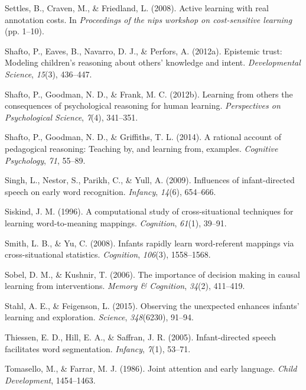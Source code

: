 \documentclass[english,floatsintext,man]{apa6}
\theoremstyle{definition}
\theoremstyle{definition}
\theoremstyle{definition}
\theoremstyle{remark}
\begin{document}
\hypertarget{ref-settles2008active}{}
Settles, B., Craven, M., \& Friedland, L. (2008). Active learning with
real annotation costs. In \emph{Proceedings of the nips workshop on
cost-sensitive learning} (pp. 1--10).

\hypertarget{ref-shafto2012epistemic}{}
Shafto, P., Eaves, B., Navarro, D. J., \& Perfors, A. (2012a). Epistemic
trust: Modeling children's reasoning about others' knowledge and intent.
\emph{Developmental Science}, \emph{15}(3), 436--447.

\hypertarget{ref-shafto2012learning}{}
Shafto, P., Goodman, N. D., \& Frank, M. C. (2012b). Learning from
others the consequences of psychological reasoning for human learning.
\emph{Perspectives on Psychological Science}, \emph{7}(4), 341--351.

\hypertarget{ref-shafto2014rational}{}
Shafto, P., Goodman, N. D., \& Griffiths, T. L. (2014). A rational
account of pedagogical reasoning: Teaching by, and learning from,
examples. \emph{Cognitive Psychology}, \emph{71}, 55--89.

\hypertarget{ref-singh2009influences}{}
Singh, L., Nestor, S., Parikh, C., \& Yull, A. (2009). Influences of
infant-directed speech on early word recognition. \emph{Infancy},
\emph{14}(6), 654--666.

\hypertarget{ref-siskind1996computational}{}
Siskind, J. M. (1996). A computational study of cross-situational
techniques for learning word-to-meaning mappings. \emph{Cognition},
\emph{61}(1), 39--91.

\hypertarget{ref-smith2008infants}{}
Smith, L. B., \& Yu, C. (2008). Infants rapidly learn word-referent
mappings via cross-situational statistics. \emph{Cognition},
\emph{106}(3), 1558--1568.

\hypertarget{ref-sobel2006importance}{}
Sobel, D. M., \& Kushnir, T. (2006). The importance of decision making
in causal learning from interventions. \emph{Memory \& Cognition},
\emph{34}(2), 411--419.

\hypertarget{ref-stahl2015observing}{}
Stahl, A. E., \& Feigenson, L. (2015). Observing the unexpected enhances
infants' learning and exploration. \emph{Science}, \emph{348}(6230),
91--94.

\hypertarget{ref-thiessen2005infant}{}
Thiessen, E. D., Hill, E. A., \& Saffran, J. R. (2005). Infant-directed
speech facilitates word segmentation. \emph{Infancy}, \emph{7}(1),
53--71.

\hypertarget{ref-tomasello1986joint}{}
Tomasello, M., \& Farrar, M. J. (1986). Joint attention and early
language. \emph{Child Development}, 1454--1463.
\end{document}
